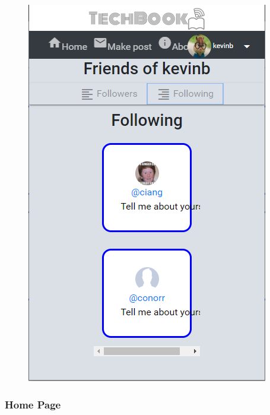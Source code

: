 \begin{figure}[H]
\begin{minipage}{.25\textwidth}
  \includegraphics[width=.9\linewidth]{img/ui/followMOBILE.PNG}
  \label{fig:followMOBILE}
\end{minipage}
\end{figure}

\subsubsection{Home Page}

